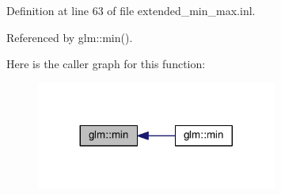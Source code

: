 Definition at line 63 of file extended\+\_\+min\+\_\+max.\+inl.



Referenced by glm\+::min().

Here is the caller graph for this function\+:
\nopagebreak
\begin{figure}[H]
\begin{center}
\leavevmode
\includegraphics[width=224pt]{df/d72/group__gtx__extended__min__max_ga7471ea4159eed8dd9ea4ac5d46c2fead_icgraph}
\end{center}
\end{figure}
